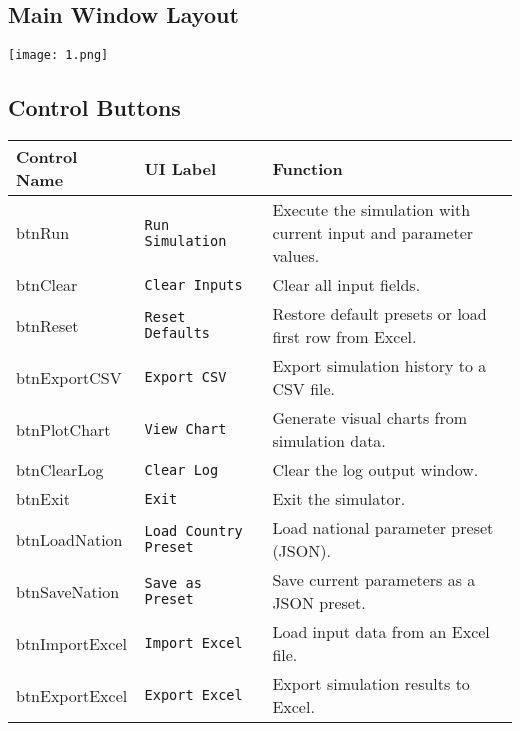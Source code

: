 \documentclass[12pt,a4paper]{article}
\begin{document}
\subsection{Main Window Layout}
\begin{center}
    \texttt{[image: 1.png]}
\end{center}

\subsection{Control Buttons}
\begin{longtable}{p{3cm} p{4cm} p{8cm}}
\toprule
\textbf{Control Name} & \textbf{UI Label} & \textbf{Function} \\
\midrule
btnRun & \texttt{Run Simulation} & Execute the simulation with current input and parameter values. \\
btnClear & \texttt{Clear Inputs} & Clear all input fields. \\
btnReset & \texttt{Reset Defaults} & Restore default presets or load first row from Excel. \\
btnExportCSV & \texttt{Export CSV} & Export simulation history to a CSV file. \\
btnPlotChart & \texttt{View Chart} & Generate visual charts from simulation data. \\
btnClearLog & \texttt{Clear Log} & Clear the log output window. \\
btnExit & \texttt{Exit} & Exit the simulator. \\
btnLoadNation & \texttt{Load Country Preset} & Load national parameter preset (JSON). \\
btnSaveNation & \texttt{Save as Preset} & Save current parameters as a JSON preset. \\
btnImportExcel & \texttt{Import Excel} & Load input data from an Excel file. \\
btnExportExcel & \texttt{Export Excel} & Export simulation results to Excel. \\
\bottomrule
\end{longtable}


\end{document}

